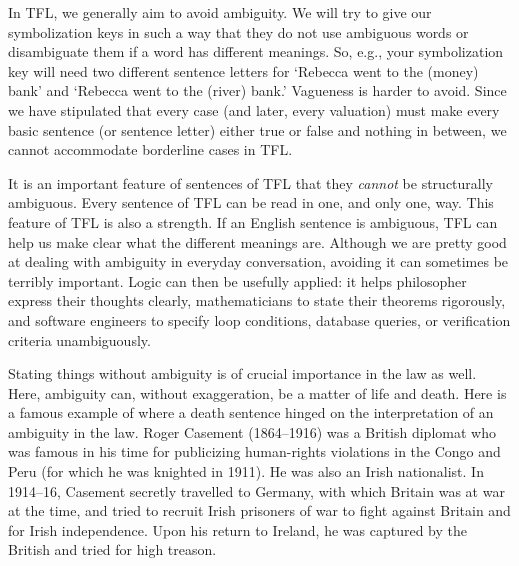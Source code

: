 In TFL, we generally aim to avoid ambiguity. We will try to give our symbolization keys in such a way that they do not use ambiguous words or  disambiguate them if a word has different meanings. So, e.g., your symbolization key will need two different sentence letters for `Rebecca went to the (money) bank' and `Rebecca went to the (river) bank.' Vagueness is harder to avoid. Since we have stipulated that every case (and later, every valuation) must make every basic sentence (or sentence letter) either true or false and nothing in between, we cannot accommodate borderline cases in TFL.

It is an important feature of sentences of TFL that they \emph{cannot} be structurally ambiguous. Every sentence of TFL can be read in one, and only one, way. This feature of TFL is also a strength. If an English sentence is ambiguous, TFL can help us make clear what the different meanings are.  Although we are pretty good at dealing with ambiguity in everyday conversation, avoiding it can sometimes be terribly important. Logic can then be usefully applied: it helps philosopher express their thoughts clearly, mathematicians to state their theorems rigorously, and software engineers to specify loop conditions, database queries, or verification criteria unambiguously. 

Stating things without ambiguity is of crucial importance in the law as well. Here, ambiguity can, without exaggeration, be a matter of life and death. Here is a famous example of where a death sentence hinged on the interpretation of an ambiguity in the law. Roger Casement (1864--1916) was a British diplomat who was famous in his time for publicizing human-rights violations in the Congo and Peru (for which he was knighted in 1911). He was also an Irish nationalist. In 1914--16, Casement secretly travelled to Germany, with which Britain was at war at the time, and tried to recruit Irish prisoners of war to fight against Britain and for Irish independence. Upon his return to Ireland, he was captured by the British and tried for high treason.

